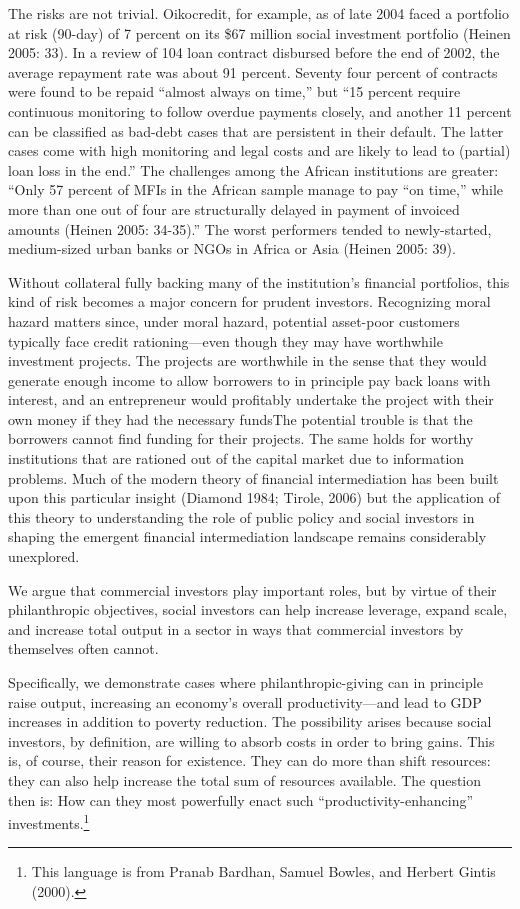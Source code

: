 \documentclass[
]{article}
\begin{document}
The risks are not trivial. Oikocredit, for example, as of late 2004
faced a portfolio at risk (90-day) of 7 percent on its \$67 million
social investment portfolio (Heinen 2005: 33). In a review of 104 loan
contract disbursed before the end of 2002, the average repayment rate
was about 91 percent. Seventy four percent of contracts were found to be
repaid ``almost always on time,'' but ``15 percent require continuous
monitoring to follow overdue payments closely, and another 11 percent
can be classified as bad-debt cases that are persistent in their
default. The latter cases come with high monitoring and legal costs and
are likely to lead to (partial) loan loss in the end.'' The challenges
among the African institutions are greater: ``Only 57 percent of MFIs in
the African sample manage to pay ``on time,'' while more than one out of
four are structurally delayed in payment of invoiced amounts (Heinen
2005: 34-35).'' The worst performers tended to newly-started,
medium-sized urban banks or NGOs in Africa or Asia (Heinen 2005: 39).

Without collateral fully backing many of the institution's financial
portfolios, this kind of risk becomes a major concern for prudent
investors. Recognizing moral hazard matters since, under moral hazard,
potential asset-poor customers typically face credit rationing---even
though they may have worthwhile investment projects. The projects are
worthwhile in the sense that they would generate enough income to allow
borrowers to in principle pay back loans with interest, and an
entrepreneur would profitably undertake the project with their own money
if they had the necessary fundsThe potential trouble is that the
borrowers cannot find funding for their projects. The same holds for
worthy institutions that are rationed out of the capital market due to
information problems. Much of the modern theory of financial
intermediation has been built upon this particular insight (Diamond
1984; Tirole, 2006) but the application of this theory to understanding
the role of public policy and social investors in shaping the emergent
financial intermediation landscape remains considerably unexplored.

We argue that commercial investors play important roles, but by virtue
of their philanthropic objectives, social investors can help increase
leverage, expand scale, and increase total output in a sector in ways
that commercial investors by themselves often cannot.

Specifically, we demonstrate cases where philanthropic-giving can in
principle raise output, increasing an economy's overall
productivity---and lead to GDP increases in addition to poverty
reduction. The possibility arises because social investors, by
definition, are willing to absorb costs in order to bring gains. This
is, of course, their reason for existence. They can do more than shift
resources: they can also help increase the total sum of resources
available. The question then is: How can they most powerfully enact such
``productivity-enhancing'' investments.\footnote{This language is from
  Pranab Bardhan, Samuel Bowles, and Herbert Gintis (2000).}
\end{document}
